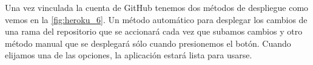 Una vez vinculada la cuenta de GitHub tenemos dos métodos de despliegue como
 vemos en la \autoref{fig:heroku_6}. Un método automático para desplegar los
 cambios de una rama del repositorio que se accionará cada vez que subamos
 cambios y otro método manual que se desplegará sólo cuando presionemos
 el botón. 
Cuando elijamos una de las opciones, la aplicación estará lista para usarse.